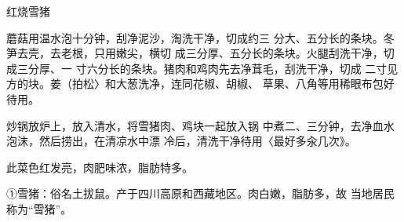 \begin{recipe}{红烧雪猪}

\ingredients


\cooking

\step 	蘑菇用温水泡十分钟，刮净泥沙，淘洗干净，切成约三 分大、五分长的条块。冬笋去壳，去老根，只用嫩尖，横切 成三分厚、五分长的条块。火腿刮洗干净，切成三分厚、一 寸六分长的条块。猪肉和鸡肉先去净茸毛，刮洗干净，切成 二寸见方的块。姜（拍松〉和大葱洗净，连同花椒、胡椒、 草果、八角等用稀眼布包好待用。

\step 	炒锅放炉上，放入清水，将雪猪肉、鸡块一起放入锅 中煮二、三分钟，去净血水泡沫，然后捞出，在清凉水中漂 冷后，清洗干净待用〈最好多汆几次》。

\ingredients


\notes

此菜色红发亮，肉肥味浓，脂肪特多。

①雪猪：俗名土拔鼠。产于四川高原和西藏地区。肉白嫩，脂肪多，故 当地居民称为“雪猪”。

\end{recipe}

